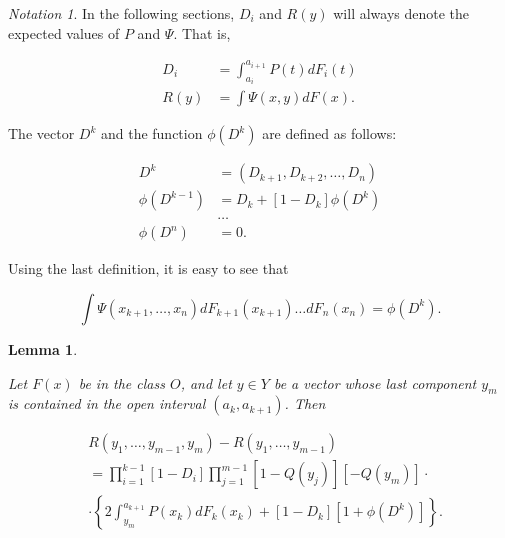 \documentclass{article}
\newtheorem{lemma}{Lemma}
\theoremstyle{remark}
\newtheorem{notation}{Notation}
\begin{document}
\begin{notation}

In the following sections, $D_i$ and $R(y)$ will always denote the expected
values of $P$ and $\Psi$. That is,

\[
\begin{aligned}
D_i &= \int_{a_i}^{a_{i+1}} P(t) dF_i(t) \\
R(y) &= \int \Psi(x,y) dF(x).
\end{aligned}
\]

\end{notation}

The vector $D^k$ and the function $\phi(D^k)$ are defined as follows:

\[
\begin{aligned}
D^k &= (D_{k+1}, D_{k+2}, \dots, D_n) \\
\phi(D^{k-1}) &= D_k + [1 - D_k] \phi(D^k) \\
& \dots \\
\phi(D^{n}) &= 0.
\end{aligned}
\]

Using the last definition, it is easy to see that

\[
\int \Psi(x_{k+1}, \dots, x_n) dF_{k+1}(x_{k+1}) \dots dF_n(x_n)
= \phi(D^k).
\]

\begin{lemma} \label{lemma:marginal-r-formula}

Let $F(x)$ be in the class $O$, and let $y \in Y$ be a vector whose last
component $y_m$ is contained in the open interval $(a_k, a_{k+1})$. Then

\[
\begin{aligned}
& R(y_1, \dots, y_{m-1}, y_m) - R(y_1, \dots, y_{m-1}) \\
&= \prod_{i=1}^{k-1} [1 - D_i] \prod_{j=1}^{m-1} [1 - Q(y_j)][-Q(y_m)] \cdot \\
&\cdot \left \{
  2 \int_{y_m}^{a_{k+1}} P(x_k) dF_k(x_k) + [1 - D_k][1 + \phi(D^k)]
\right \}.
\end{aligned}
\]

\end{lemma}
\end{document}
